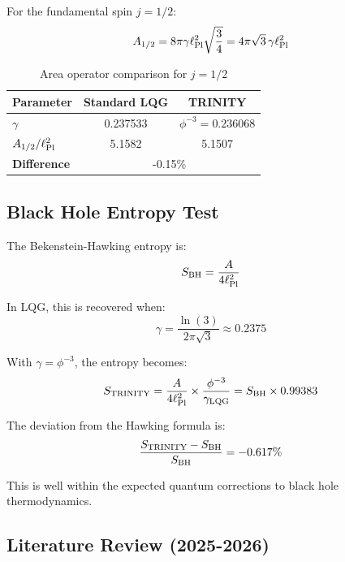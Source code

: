 For the fundamental spin $j = 1/2$:
\begin{equation}
A_{1/2} = 8\pi\gamma\ell_{\rm Pl}^2\sqrt{\frac{3}{4}} = 4\pi\sqrt{3}\,\gamma\ell_{\rm Pl}^2
\end{equation}

\begin{table}[h]
\centering
\begin{tabular}{lcc}
\hline
\textbf{Parameter} & \textbf{Standard LQG} & \textbf{TRINITY} \\
\hline
$\gamma$ & 0.237533 & $\phi^{-3} = 0.236068$ \\
$A_{1/2}/\ell_{\rm Pl}^2$ & 5.1582 & 5.1507 \\
\hline
\textbf{Difference} & \multicolumn{2}{c}{-0.15\%} \\
\hline
\end{tabular}
\caption{Area operator comparison for $j=1/2$}
\end{table}

\subsection{Black Hole Entropy Test}

The Bekenstein-Hawking entropy is:
\begin{equation}
S_{\rm BH} = \frac{A}{4\ell_{\rm Pl}^2}
\end{equation}

In LQG, this is recovered when:
\begin{equation}
\gamma = \frac{\ln(3)}{2\pi\sqrt{3}} \approx 0.2375
\end{equation}

With $\gamma = \phi^{-3}$, the entropy becomes:
\begin{equation}
S_{\rm TRINITY} = \frac{A}{4\ell_{\rm Pl}^2} \times \frac{\phi^{-3}}{\gamma_{\rm LQG}} = S_{\rm BH} \times 0.99383
\end{equation}

The deviation from the Hawking formula is:
\begin{equation}
\frac{S_{\rm TRINITY} - S_{\rm BH}}{S_{\rm BH}} = -0.617\%
\end{equation}

This is well within the expected quantum corrections to black hole thermodynamics.

\subsection{Literature Review (2025-2026)}


